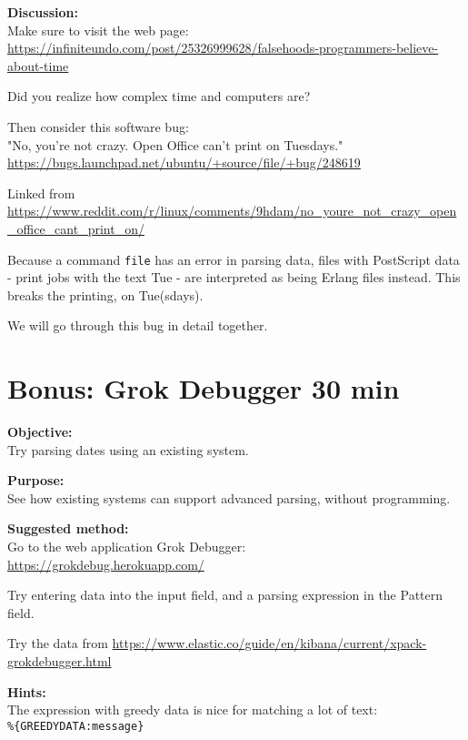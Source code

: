 \documentclass[a4paper,11pt,notitlepage]{report}
\begin{document}
{\bf Discussion:}\\
Make sure to visit the web page:\\
\url{https://infiniteundo.com/post/25326999628/falsehoods-programmers-believe-about-time}

Did you realize how complex time and computers are?

Then consider this software bug:\\
"No, you're not crazy. Open Office can't print on Tuesdays."\\
\url{https://bugs.launchpad.net/ubuntu/+source/file/+bug/248619}

Linked from\\
{\footnotesize\url{https://www.reddit.com/r/linux/comments/9hdam/no_youre_not_crazy_open_office_cant_print_on/}}

Because a command \verb+file+ has an error in parsing data, files with PostScript data - print jobs with the text Tue - are interpreted as being Erlang files instead. This breaks the printing, on Tue(sdays).

We will go through this bug in detail together.


\chapter{Bonus: Grok Debugger 30 min}
\label{ex:grokdebugger1}


{\bf Objective:}\\
Try parsing dates using an existing system.

{\bf Purpose:}\\
See how existing systems can support advanced parsing, without programming.

{\bf Suggested method:}\\
Go to the web application Grok Debugger:\\
\url{https://grokdebug.herokuapp.com/}

Try entering data into the input field, and a parsing expression in the Pattern field.

Try the data from
\url{https://www.elastic.co/guide/en/kibana/current/xpack-grokdebugger.html}



{\bf Hints:}\\
The expression with greedy data is nice for matching a lot of text:\\
\verb+%{GREEDYDATA:message}+
\end{document}
